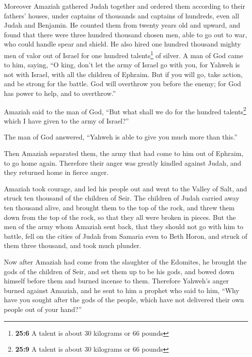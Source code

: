  Moreover Amaziah gathered Judah together and ordered them
according to their fathers' houses, under captains of thousands and
captains of hundreds, even all Judah and Benjamin. He counted them from
twenty years old and upward, and found that there were three hundred
thousand chosen men, able to go out to war, who could handle spear and
shield.  He also hired one hundred thousand mighty men of
valor out of Israel for one hundred talents\footnote{\textbf{25:6} A
  talent is about 30 kilograms or 66 pounds} of silver.  A
man of God came to him, saying, ``O king, don't let the army of Israel
go with you, for Yahweh is not with Israel, with all the children of
Ephraim.  But if you will go, take action, and be strong
for the battle. God will overthrow you before the enemy; for God has
power to help, and to overthrow.''

 Amaziah said to the man of God, ``But what shall we do
for the hundred talents\footnote{\textbf{25:9} A talent is about 30
  kilograms or 66 pounds} which I have given to the army of Israel?''

The man of God answered, ``Yahweh is able to give you much more than
this.''

 Then Amaziah separated them, the army that had come to
him out of Ephraim, to go home again. Therefore their anger was greatly
kindled against Judah, and they returned home in fierce anger.

 Amaziah took courage, and led his people out and went to
the Valley of Salt, and struck ten thousand of the children of Seir.
 The children of Judah carried away ten thousand alive,
and brought them to the top of the rock, and threw them down from the
top of the rock, so that they all were broken in pieces. 
But the men of the army whom Amaziah sent back, that they should not go
with him to battle, fell on the cities of Judah from Samaria even to
Beth Horon, and struck of them three thousand, and took much plunder.

 Now after Amaziah had come from the slaughter of the
Edomites, he brought the gods of the children of Seir, and set them up
to be his gods, and bowed down himself before them and burned incense to
them.  Therefore Yahweh's anger burned against Amaziah,
and he sent to him a prophet who said to him, ``Why have you sought
after the gods of the people, which have not delivered their own people
out of your hand?''

